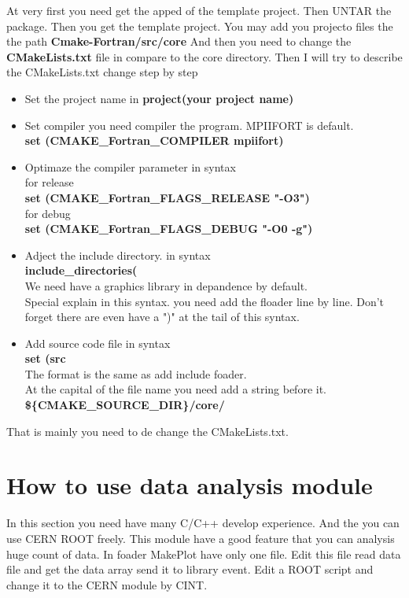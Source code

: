 \documentclass[DIV=calc, paper=a4, fontsize=11pt, twocolumn]{scrartcl}	 %
\begin{document}
At very first you need get the apped of the template project.
Then UNTAR the package.
Then you get the template project.
You may add you projecto files the the path \textbf{Cmake-Fortran/src/core}
And then you need to change the \textbf{CMakeLists.txt} file in compare to the core directory.
Then I will try to describe the CMakeLists.txt change step by step
\begin{itemize}
\item Set the project name in \textbf{project(your project name)}
\item Set compiler you need compiler the program. MPIIFORT is default. \\
	\textbf{set (CMAKE\_Fortran\_COMPILER mpiifort)}
\item Optimaze the compiler parameter in syntax\\
	for release \\
	\textbf{set (CMAKE\_Fortran\_FLAGS\_RELEASE "-O3")}\\
	for debug \\
	\textbf{set (CMAKE\_Fortran\_FLAGS\_DEBUG   "-O0 -g")}
\item Adject the include directory.  in syntax \\
	\textbf{include\_directories( }\\
	We need have a graphics library in depandence by default.\\
	Special explain in this syntax. you need add the floader line by line.
	Don't forget there are even have a ")" at the tail of this syntax.
\item Add source code file in syntax \\
	\textbf{set (src }\\
	The format is the same as add include foader.\\
	At the capital of the file name you need add a string before it.
	\textbf{ \$\{CMAKE\_SOURCE\_DIR\}/core/ }
\end{itemize}

That is mainly you need to de change the CMakeLists.txt.

\section{How to use data analysis module}

In this section you need have many C/C++ develop experience.
And the you can use CERN ROOT freely.
This module have a good feature that you can analysis huge count of data.
In foader MakePlot have only one file.
Edit this file read data file and get the data array send it to library event.
Edit a ROOT script and change it to the CERN module by CINT.
\end{document}
